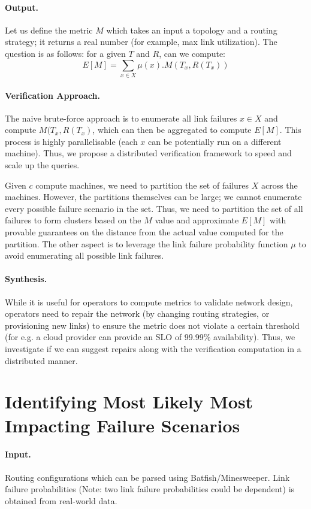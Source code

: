 \documentclass[]{article}
\begin{document}
\paragraph{Output.} Let us define the
metric $M$ which takes an input a topology and a routing 
strategy; it returns a 
real number (for example, max link utilization). 
The question is as follows: for a given $T$ and $R$,
can we compute: 
\[
	E[M] = \sum_{x \in X} \mu(x). M(T_x, R(T_x))
\]

\paragraph{Verification Approach.} The naive brute-force 
approach is to enumerate all link failures $x \in X$
and compute $M(T_x, R(T_x)$, which can then be aggregated to 
compute $E[M]$. This process is highly parallelisable (each 
$x$ can be potentially run on a different machine). Thus, we
propose a distributed verification framework to speed and 
scale up the queries.  

Given $c$ compute machines, we need to partition
the set of failures $X$ across
 the machines. However, the partitions themselves
 can be large; we cannot enumerate
 every possible failure scenario in the set. 
 Thus, we need to partition the set of all failures
 to form clusters based on the $M$ value 
 and approximate $E[M]$ with 
 provable guarantees on the distance from the actual 
 value computed for the partition. The other aspect 
 is to leverage the link failure probability function
 $\mu$ to avoid enumerating all possible link failures.
 
  

\paragraph{Synthesis.} While it is useful for operators
to compute metrics to validate network design, operators need
to repair the network (by changing routing strategies, or 
provisioning new links) to ensure the metric does not violate
a certain threshold (for e.g. a cloud provider can provide 
an SLO of 99.99\% availability). Thus, we investigate 
if we can suggest repairs along with the verification computation
in a distributed manner. 
 
\section{Identifying Most Likely Most Impacting Failure Scenarios}
\paragraph{Input.} Routing configurations which can be parsed
using Batfish/Minesweeper. Link failure probabilities (Note: 
two link failure probabilities could be dependent) is obtained
from real-world data. 
\end{document}
